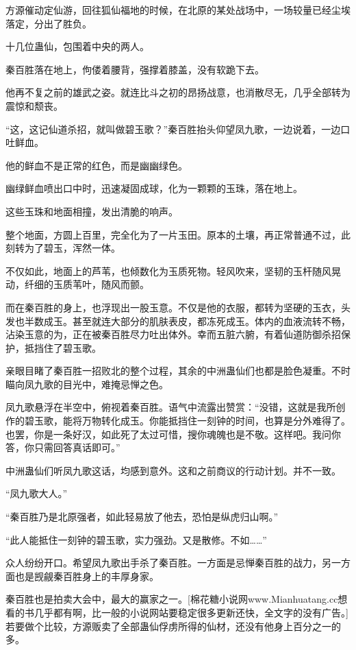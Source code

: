
\begin{this_body}

方源催动定仙游，回往狐仙福地的时候，在北原的某处战场中，一场较量已经尘埃落定，分出了胜负。

十几位蛊仙，包围着中央的两人。

秦百胜落在地上，佝偻着腰背，强撑着膝盖，没有软跪下去。

他再不复之前的雄武之姿。就连比斗之初的昂扬战意，也消散尽无，几乎全部转为震惊和颓丧。

“这，这记仙道杀招，就叫做碧玉歌？”秦百胜抬头仰望凤九歌，一边说着，一边口吐鲜血。

他的鲜血不是正常的红色，而是幽幽绿色。

幽绿鲜血喷出口中时，迅速凝固成球，化为一颗颗的玉珠，落在地上。

这些玉珠和地面相撞，发出清脆的响声。

整个地面，方圆上百里，完全化为了一片玉田。原本的土壤，再正常普通不过，此刻转为了碧玉，浑然一体。

不仅如此，地面上的芦苇，也倾数化为玉质死物。轻风吹来，坚韧的玉杆随风晃动，纤细的玉质苇叶，随风而颤。

而在秦百胜的身上，也浮现出一股玉意。不仅是他的衣服，都转为坚硬的玉衣，头发也半数成玉。甚至就连大部分的肌肤表皮，都冻死成玉。体内的血液流转不畅，沾染玉意的为，正在被秦百胜尽力吐出体外。幸而五脏六腑，有着仙道防御杀招保护，抵挡住了碧玉歌。

亲眼目睹了秦百胜一招败北的整个过程，其余的中洲蛊仙们也都是脸色凝重。不时瞄向凤九歌的目光中，难掩忌惮之色。

凤九歌悬浮在半空中，俯视着秦百胜。语气中流露出赞赏：“没错，这就是我所创作的碧玉歌，能将万物转化成玉。你能抵挡住一刻钟的时间，也算是分外难得了。也罢，你是一条好汉，如此死了太过可惜，搜你魂魄也是不敬。这样吧。我问你答，你只需回答真话即可。”

中洲蛊仙们听凤九歌这话，均感到意外。这和之前商议的行动计划。并不一致。

“凤九歌大人。”

“秦百胜乃是北原强者，如此轻易放了他去，恐怕是纵虎归山啊。”

“此人能抵住一刻钟的碧玉歌，实力强劲。又是散修。不如……”

众人纷纷开口。希望凤九歌出手杀了秦百胜。一方面是忌惮秦百胜的战力，另一方面也是觊觎秦百胜身上的丰厚身家。

秦百胜也是拍卖大会中，最大的赢家之一。[棉花糖小说网www.Mianhuatang.cc想看的书几乎都有啊，比一般的小说网站要稳定很多更新还快，全文字的没有广告。]若要做个比较，方源贩卖了全部蛊仙俘虏所得的仙材，还没有他身上百分之一的多。


\end{this_body}
